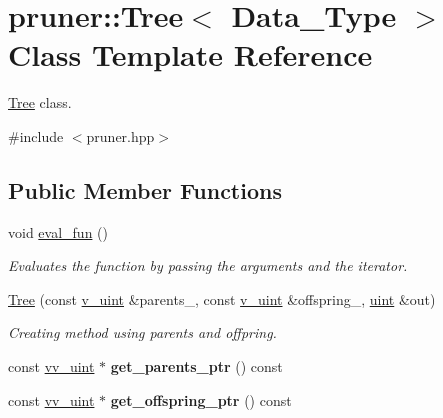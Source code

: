 \hypertarget{classpruner_1_1Tree}{}\section{pruner\+:\+:Tree$<$ Data\+\_\+\+Type $>$ Class Template Reference}
\label{classpruner_1_1Tree}


\hyperlink{classpruner_1_1Tree}{Tree} class.  




{\ttfamily \#include $<$pruner.\+hpp$>$}

\subsection*{Public Member Functions}
\begin{DoxyCompactItemize}
\item 
\mbox{\label{classpruner_1_1Tree_a5e079a7857ea4c7e44f339d64c77c7fe}} 
void \hyperlink{classpruner_1_1Tree_a5e079a7857ea4c7e44f339d64c77c7fe}{eval\+\_\+fun} ()
\begin{DoxyCompactList}\small\item\em Evaluates the function by passing the arguments and the iterator. \end{DoxyCompactList}\item 
\hyperlink{classpruner_1_1Tree_a792b1c2d2a658a43a1c9098514c7b193}{Tree} (const \hyperlink{namespacepruner_af0145646bd7ede012cd336b416bc5579}{v\+\_\+uint} \&parents\+\_\+, const \hyperlink{namespacepruner_af0145646bd7ede012cd336b416bc5579}{v\+\_\+uint} \&offspring\+\_\+, \hyperlink{namespacepruner_a659e6e64a9e2b8e981c3d34262a2f67e}{uint} \&out)
\begin{DoxyCompactList}\small\item\em Creating method using parents and offpring. \end{DoxyCompactList}\item 
\mbox{\label{classpruner_1_1Tree_a8479fe0082710ccfeb16ce34b8801f25}} 
const \hyperlink{namespacepruner_acc0badaa0c5a170f5f93cfc20ec428a2}{vv\+\_\+uint} $\ast$ {\bfseries get\+\_\+parents\+\_\+ptr} () const
\item 
\mbox{\label{classpruner_1_1Tree_aae9e8bca96b969d30b94460393282053}} 
const \hyperlink{namespacepruner_acc0badaa0c5a170f5f93cfc20ec428a2}{vv\+\_\+uint} $\ast$ {\bfseries get\+\_\+offspring\+\_\+ptr} () const

\end{DoxyCompactItemize}
